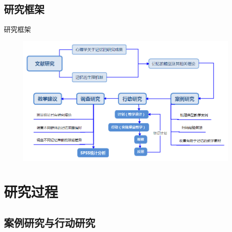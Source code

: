 \documentclass[serif]{beamer}
\begin{document}
  \subsection{研究框架}
  \begin{frame}{研究框架}
      \begin{figure}[t]
      	\raggedright
      	\includegraphics[scale=0.35]{researchframe.png}
      \end{figure}
  \end{frame}
    \section{研究过程}
    \subsection{案例研究与行动研究}
\end{document}
